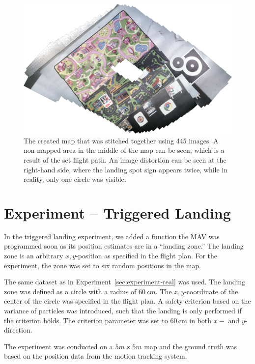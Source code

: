 \documentclass[11pt]{report}
\begin{document}
\begin{figure}[h!]
\begin{center}
\includegraphics[width=0.7\columnwidth]{map_rotated}
\caption{{\label{fig:mapexp} The created map that was stitched
    together using 445 images. A non-mapped area in the middle of the
    map can be seen, which is a result of the set flight path. An
    image distortion can be seen at the right-hand side, where the
    landing spot sign appears twice, while in reality, only one circle
    was visible.%
  }}
\end{center}
\end{figure}

\section{Experiment -- Triggered Landing}
\label{sec:triggered}

In the triggered landing experiment, we added a function the MAV was
programmed soon as its position estimates are in a ``landing zone.''
The landing zone is an arbitrary $x,y$-position as specified in the
flight plan. For the experiment, the zone was set to six random
positions in the map.

The same dataset as in Experiment~\ref{sec:experiment-real} was
used. The landing zone was defined as a circle with a radius of
$60\,cm$. The $x,y$-coordinate of the center of the circle was
specified in the flight plan. A safety criterion based on the variance
of particles was introduced, such that the landing is only performed
if the criterion holds. The criterion parameter was set to 60\,cm in
both $x-$ and $y$-direction.

The experiment was conducted on a $5m \times 5m$ map and the ground
truth was based on the position data from the motion tracking
system. 

\end{document}
